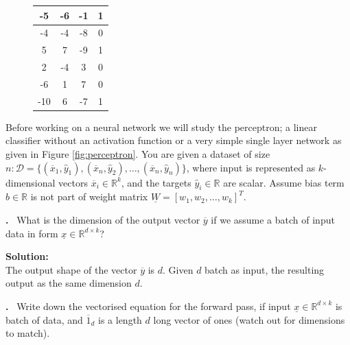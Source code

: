 \documentclass[12pt]{article}
\newcounter{problem}
\newcounter{solution}
\newcommand\Problem{%
	\stepcounter{problem}%
	\textbf{\theproblem.}~%
	\setcounter{solution}{0}%
}
\newcommand\Solution{%
	\textbf{Solution:}\\%
}
\begin{document}
\begin{figure}[h!]
\begin{minipage}[c]{.49\textwidth}
\begin{tabular}{|c|c|c|c|}
				-5         & -6         & -1         & 1                           \\\hline
				-4         & -4         & -8         & 0                           \\\hline
				5          & 7          & -9         & 1                           \\\hline
				2          & -4         & 3          & 0                           \\\hline
				-6         & 1          & 7          & 0                           \\\hline
				-10        & 6          & -7         & 1                          \\\hline
			\end{tabular}
			\label{tab:train-dataset}
	
	\end{minipage}
\end{figure}

Before working on a neural network we will study the perceptron; a linear classifier
without an activation function or a very simple single layer network as given in Figure \ref{fig:perceptron}.
You are given a dataset of size $n: \mathcal{D} = \{(\overline{x}_1 ,\hat{y}_1),(\overline{x}_n ,\hat{y}_2),\dots , (\overline{x}_n ,\hat{y}_n)\}$, where input is represented as $k$-dimensional vectors $\overline{x}_i \in \mathbb{R}^k$, and the targets $\hat{y}_i \in \mathbb{R}$ are scalar. Assume bias term $b \in \mathbb{R}$ is not part of weight matrix $\underline{W} = [w_1,w_2,\dots,w_k]^T$.

\newpage

\Problem{What is the dimension of the output vector $\overline{y}$ if we assume a batch of input data in form $\underline{x} \in \mathbb{R}^{d \times k}$?}

\Solution{The output shape of the vector $\overline{y}$ is $d$. Given $d$ batch as input, the resulting output as the same dimension $d$.}

\Problem{Write down the vectorised equation for the forward pass, if input $\underline{x} \in \mathbb{R}^{d \times k}$ is batch of data, and $\overline{1}_d$ is a length $d$ long vector of ones (watch out for dimensions to match).}
\end{document}
